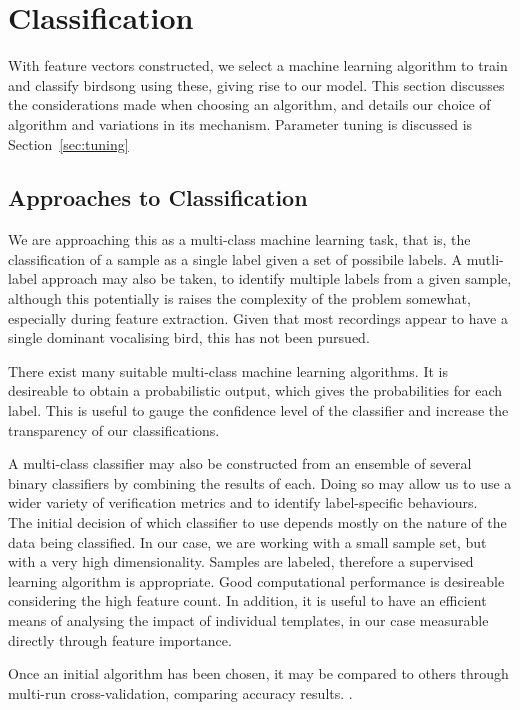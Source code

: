 \section{Classification}
With feature vectors constructed, we select a machine learning algorithm to
train and classify birdsong using these, giving rise to our model.
This section discusses the considerations made when choosing an algorithm,
and details our choice of algorithm and variations in its mechanism.
Parameter tuning is discussed is Section~\ref{sec:tuning}

\subsection{Approaches to Classification}\label{sec:clfapp}
We are approaching this as a multi-class machine learning task, that is, the
classification of a sample as a single label given a set of possibile labels.
A mutli-label approach may also be taken, to identify multiple labels from a
given sample, although this potentially is raises the complexity of the problem
somewhat, especially during feature extraction.
Given that most recordings appear to have a single dominant vocalising
bird, this has not been pursued.

There exist many suitable multi-class machine learning algorithms.
It is desireable to obtain a probabilistic output, which gives the probabilities
for each label.
This is useful to gauge the confidence level of the classifier and increase the
transparency of our classifications.

A multi-class classifier may also be constructed from an ensemble of several
binary classifiers by combining the results of each.
Doing so may allow us to use a wider variety of verification metrics and to
identify label-specific behaviours.\\

The initial decision of which classifier to use depends mostly on the nature
of the data being classified.
In our case, we are working with a small sample set, but with a very high 
dimensionality.
Samples are labeled, therefore a supervised learning algorithm is appropriate.
Good computational performance is desireable considering the high feature count.
In addition, it is useful to have an efficient means of analysing the impact of
individual templates, in our case measurable directly through feature importance.

Once an initial algorithm has been chosen, it may be compared to others through
multi-run cross-validation, comparing accuracy results.
\parencite{Bouckaert2003}.

